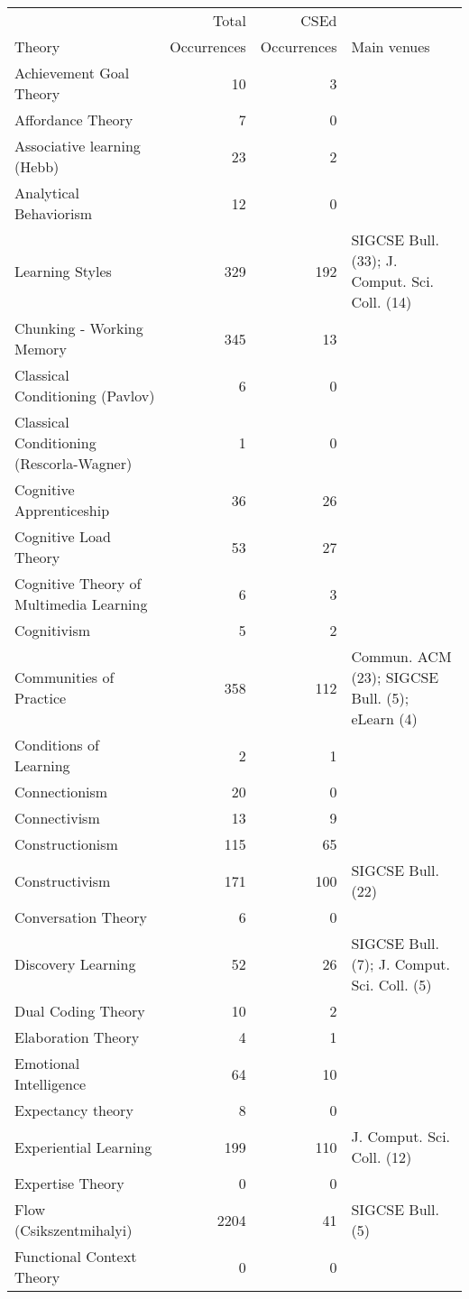 \begin{table*}[t]
\begin{tabular}{lrrp{6cm}}
& Total & CSEd & \\Theory & Occurrences & Occurrences & Main venues\\\hline
Achievement Goal Theory & 10 & 3 &  \\
Affordance Theory & 7 & 0 &  \\
Associative learning (Hebb) & 23 & 2 &  \\
Analytical Behaviorism & 12 & 0 &  \\
Learning Styles & 329 & 192 & SIGCSE Bull. (33); J. Comput. Sci. Coll. (14) \\
Chunking - Working Memory & 345 & 13 &  \\
Classical Conditioning (Pavlov) & 6 & 0 &  \\
Classical Conditioning (Rescorla-Wagner) & 1 & 0 &  \\
Cognitive Apprenticeship & 36 & 26 &  \\
Cognitive Load Theory & 53 & 27 &  \\
Cognitive Theory of Multimedia Learning & 6 & 3 &  \\
Cognitivism & 5 & 2 &  \\
Communities of Practice & 358 & 112 & Commun. ACM (23); SIGCSE Bull. (5); eLearn (4) \\
Conditions of Learning & 2 & 1 &  \\
Connectionism & 20 & 0 &  \\
Connectivism & 13 & 9 &  \\
Constructionism & 115 & 65 &  \\
Constructivism & 171 & 100 & SIGCSE Bull. (22) \\
Conversation Theory & 6 & 0 &  \\
Discovery Learning & 52 & 26 & SIGCSE Bull. (7); J. Comput. Sci. Coll. (5) \\
Dual Coding Theory & 10 & 2 &  \\
Elaboration Theory & 4 & 1 &  \\
Emotional Intelligence & 64 & 10 &  \\
Expectancy theory & 8 & 0 &  \\
Experiential Learning & 199 & 110 & J. Comput. Sci. Coll. (12) \\
Expertise Theory & 0 & 0 &  \\
Flow (Csikszentmihalyi) & 2204 & 41 & SIGCSE Bull. (5) \\
Functional Context Theory & 0 & 0 &  \\

\end{tabular}
\end{table*}
